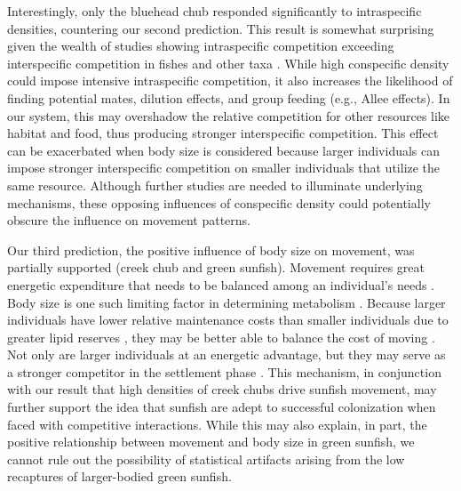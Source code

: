 \documentclass[11pt, class=article, crop=false]{standalone}
\begin{document}
Interestingly, only the bluehead chub responded significantly to intraspecific densities, countering our second prediction. This result is somewhat surprising given the wealth of studies showing intraspecific competition exceeding interspecific competition in fishes \citep{websterMechanismsIndividualConsequences2000, wardIntraspecificFoodCompetition2006} and other taxa \citep{adlerCompetitionCoexistencePlant2018, barabasEffectIntraInterspecific2016, thompsonProcessbasedMetacommunityFramework2020, chessonRolesHarshFluctuating1997, tilmanResourceCompetitionCommunity1982, mcpeekIntraspecificDensityDependence2012}. While high conspecific density could impose intensive intraspecific competition, it also increases the likelihood of finding potential mates, dilution effects, and group feeding (e.g., Allee effects)\citep{courchampAlleeEffectsEcology2008, gascoigneAlleeEffectsDriven2004, teruiCrypticAlleeEffect2015}. In our system, this may overshadow the relative competition for other resources like habitat and food, thus producing stronger interspecific competition. This effect can be exacerbated when body size is considered because larger individuals can impose stronger interspecific competition on smaller individuals that utilize the same resource. Although further studies are needed to illuminate underlying mechanisms, these opposing influences of conspecific density could potentially obscure the influence on movement patterns. 

Our third prediction, the positive influence of body size on movement, was partially supported (creek chub and green sunfish). Movement requires great energetic expenditure that needs to be balanced among an individual’s needs \citep{boisclairImportanceActivityBioenergetics1989, joblingBioenergeticsFeedIntake1993, cookeMovementEcologyFishes2022}. Body size is one such limiting factor in determining metabolism \citep{beamish2SwimmingCapacity1978, rubio-graciaSizerelatedEffectsInfluence2020}. Because larger individuals have lower relative maintenance costs than smaller individuals due to greater lipid reserves \citep{brownSizeMattersTest2004, krauseRefugeUseFish1998, kannoBodyConditionMetrics2023}, they may be better able to balance the cost of moving \citep{schlagelMovementmediatedCommunityAssembly2020}. Not only are larger individuals at an energetic advantage, but they may serve as a stronger competitor in the settlement phase \citep{rasmussenIndividualMovementStream2017}. This mechanism, in conjunction with our result that high densities of creek chubs drive sunfish movement, may further support the idea that sunfish are adept to successful colonization when faced with competitive interactions. While this may also explain, in part, the positive relationship between movement and body size in green sunfish, we cannot rule out the possibility of statistical artifacts arising from the low recaptures of larger-bodied green sunfish. 
\end{document}
